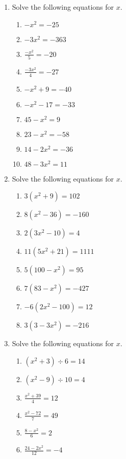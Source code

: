 \documentclass[a4paper,12pt]{article}
\begin{document}
\begin{enumerate}
\item Solve the following equations for $x$.
    \begin{multicols}{2}
    \begin{enumerate}
    \item $-x^2 = -25$
    \item $-3x^2 = -363$
    \item $ \frac{-x^2}{5} = -20$
    \item $ \frac{-3x^2}{4} = -27$
    \item $-x^2 + 9 = -40$
    \item $-x^2 - 17 = -33$
    \item $45 - x^2 = 9$
    \item $23 - x^2 = -58$
    \item $14 - 2x^2 = -36$
    \item $48 - 3x^2 = 11$
    \end{enumerate}
    \end{multicols}

\item Solve the following equations for $x$.
    \begin{multicols}{2}
    \begin{enumerate}
    \item $3(x^2 + 9) = 102$
    \item $8(x^2 - 36) = -160$
    \item $2(3x^2 - 10) = 4$
    \item $11(5x^2 + 21) = 1111$
    \item $5(100 - x^2) = 95$
    \item $7(83 - x^2) = -427$
    \item $-6(2x^2 - 100) = 12$
    \item $3(3-3x^2) = -216$
    \end{enumerate}
    \end{multicols}

\item Solve the following equations for $x$.
    \begin{multicols}{2}
    \begin{enumerate}
    \item $(x^2 + 3) \div 6 = 14$
    \item $(x^2 - 9) \div 10 = 4$
    \item $ \frac{x^2 + 39}{4} = {12}$
    \item $ \frac{x^2 - 72}{7} = {49}$
    \item $ \frac{8 - x^2}{6} = {2}$
    \item $ \frac{24 - 2x^2}{12} = {-4}$
    \end{enumerate}
    \end{multicols}


\end{enumerate}
\end{document}
